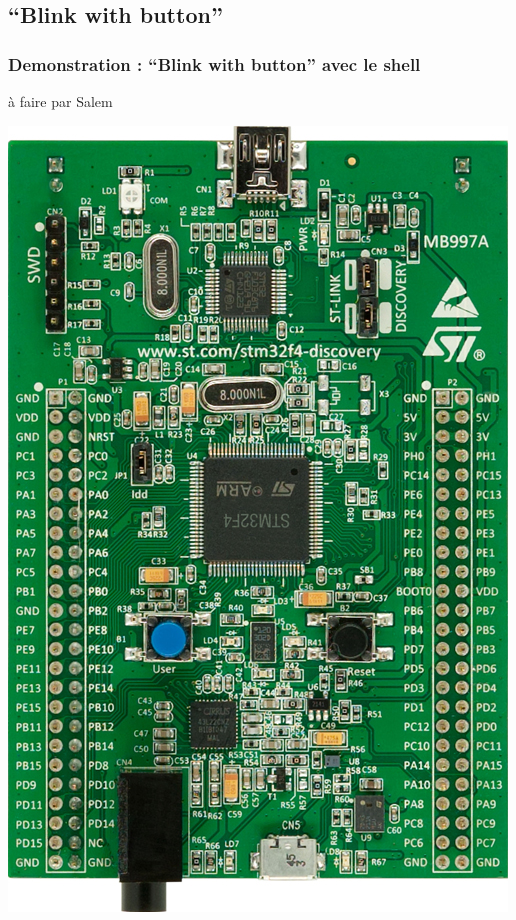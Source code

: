 \documentclass{beamer}
\begin{document}
\subsection{``Blink with button''}
\begin{frame}
\frametitle{Demonstration : ``Blink with button'' avec le shell}
à faire par Salem
\begin{center}
 \includegraphics[scale=0.1]{../images/stm32f4_discovery.jpg}
\end{center}
\end{frame}
\end{document}
